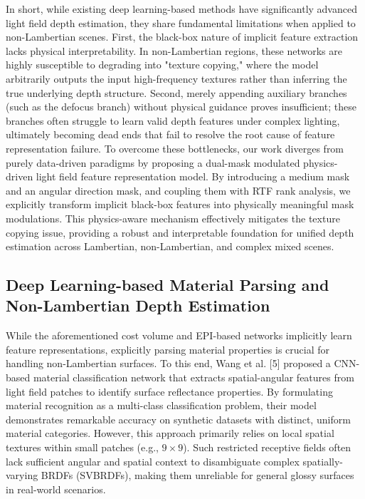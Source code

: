 In short, while existing deep learning-based methods have significantly advanced light field depth estimation, they share fundamental limitations when applied to non-Lambertian scenes. First, the black-box nature of implicit feature extraction lacks physical interpretability. In non-Lambertian regions, these networks are highly susceptible to degrading into "texture copying," where the model arbitrarily outputs the input high-frequency textures rather than inferring the true underlying depth structure. Second, merely appending auxiliary branches (such as the defocus branch) without physical guidance proves insufficient; these branches often struggle to learn valid depth features under complex lighting, ultimately becoming dead ends that fail to resolve the root cause of feature representation failure. To overcome these bottlenecks, our work diverges from purely data-driven paradigms by proposing a dual-mask modulated physics-driven light field feature representation model. By introducing a medium mask and an angular direction mask, and coupling them with RTF rank analysis, we explicitly transform implicit black-box features into physically meaningful mask modulations. This physics-aware mechanism effectively mitigates the texture copying issue, providing a robust and interpretable foundation for unified depth estimation across Lambertian, non-Lambertian, and complex mixed scenes.

\subsection{Deep Learning-based Material Parsing and Non-Lambertian Depth Estimation}

While the aforementioned cost volume and EPI-based networks implicitly learn feature representations, explicitly parsing material properties is crucial for handling non-Lambertian surfaces. To this end, Wang et al. [5] proposed a CNN-based material classification network that extracts spatial-angular features from light field patches to identify surface reflectance properties. By formulating material recognition as a multi-class classification problem, their model demonstrates remarkable accuracy on synthetic datasets with distinct, uniform material categories. However, this approach primarily relies on local spatial textures within small patches (e.g., $9 \times 9$). Such restricted receptive fields often lack sufficient angular and spatial context to disambiguate complex spatially-varying BRDFs (SVBRDFs), making them unreliable for general glossy surfaces in real-world scenarios.

